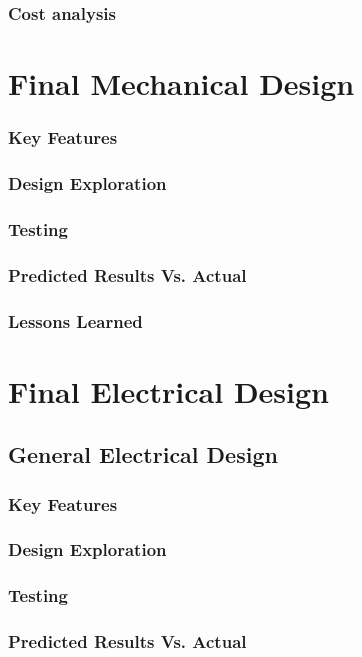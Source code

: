 \documentclass[ece]{uw-wkrpt}
\let\oldsection\section
\renewcommand\section{\clearpage\oldsection}
\begin{document}
\subsubsection{Cost analysis}

% 
\section{Final Mechanical Design}

\subsubsection{Key Features}
\subsubsection{Design Exploration}
\subsubsection{Testing}
\subsubsection{Predicted Results Vs. Actual}
\subsubsection{Lessons Learned}

% 
\section{Final Electrical Design}

\subsection{General Electrical Design}
\subsubsection{Key Features}
\subsubsection{Design Exploration} 
\subsubsection{Testing} 
\subsubsection{Predicted Results Vs. Actual} 
\end{document}
